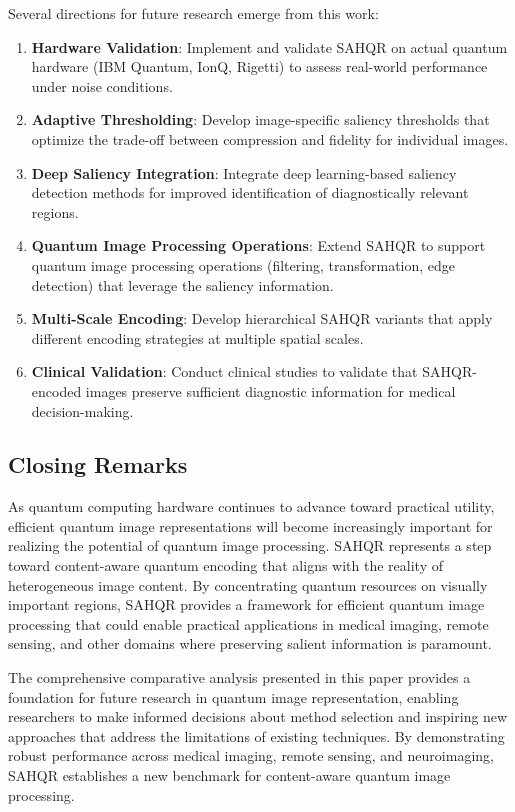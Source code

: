 \documentclass{ipol}
\begin{document}
Several directions for future research emerge from this work:

\begin{enumerate}
\item \textbf{Hardware Validation}: Implement and validate SAHQR on actual quantum hardware (IBM Quantum, IonQ, Rigetti) to assess real-world performance under noise conditions.

\item \textbf{Adaptive Thresholding}: Develop image-specific saliency thresholds that optimize the trade-off between compression and fidelity for individual images.

\item \textbf{Deep Saliency Integration}: Integrate deep learning-based saliency detection methods for improved identification of diagnostically relevant regions.

\item \textbf{Quantum Image Processing Operations}: Extend SAHQR to support quantum image processing operations (filtering, transformation, edge detection) that leverage the saliency information.

\item \textbf{Multi-Scale Encoding}: Develop hierarchical SAHQR variants that apply different encoding strategies at multiple spatial scales.

\item \textbf{Clinical Validation}: Conduct clinical studies to validate that SAHQR-encoded images preserve sufficient diagnostic information for medical decision-making.
\end{enumerate}

\subsection{Closing Remarks}

As quantum computing hardware continues to advance toward practical utility, efficient quantum image representations will become increasingly important for realizing the potential of quantum image processing. SAHQR represents a step toward content-aware quantum encoding that aligns with the reality of heterogeneous image content. By concentrating quantum resources on visually important regions, SAHQR provides a framework for efficient quantum image processing that could enable practical applications in medical imaging, remote sensing, and other domains where preserving salient information is paramount.

The comprehensive comparative analysis presented in this paper provides a foundation for future research in quantum image representation, enabling researchers to make informed decisions about method selection and inspiring new approaches that address the limitations of existing techniques. By demonstrating robust performance across medical imaging, remote sensing, and neuroimaging, SAHQR establishes a new benchmark for content-aware quantum image processing.
\end{document}
